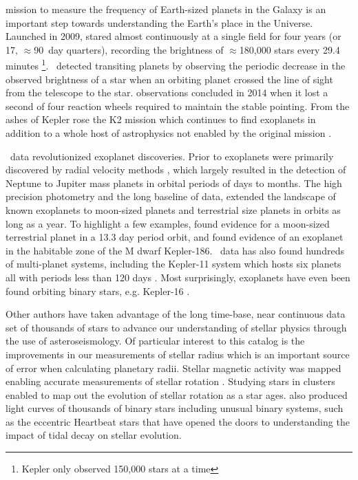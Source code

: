 
 mission to measure the frequency of Earth-sized planets in the Galaxy is an important step towards understanding the Earth's place in the Universe.  Launched in 2009, \Kepler{} stared almost continuously at a single field for four years (or 17, $\approx$90~day quarters), recording the brightness of $\approx$180,000 stars every 29.4 minutes \footnote{Kepler only observed 150,000 stars at a time}. \Kepler\ detected transiting planets by observing the periodic decrease in the observed brightness of a star when an orbiting planet crossed the line of sight from the telescope to the star.  observations concluded in 2014 when it lost a second of four reaction wheels required to maintain the stable pointing.  From the ashes of Kepler rose the K2 mission which continues to find exoplanets in addition to a whole host of astrophysics not enabled by the original \Kepler{} mission \citep{Howell2014}.


\Kepler\ data revolutionized exoplanet discoveries. Prior to \Kepler{,} exoplanets were primarily discovered by radial velocity methods \citep[e.g.][]{Mayor1995}, which largely resulted in the detection of Neptune to Jupiter mass planets in orbital periods of days to months. The high precision photometry and the long baseline of \Kepler{} data, extended the landscape of known exoplanets to moon-sized planets and terrestrial size planets in orbits as long as a year. To highlight a few examples, \citep{Barclay2013} found evidence for a moon-sized terrestrial planet in a 13.3 day period orbit, and \citep{Quintana2014} found evidence of an exoplanet in the habitable zone of the M dwarf Kepler-186. \Kepler\ data has also found hundreds of multi-planet systems, including the Kepler-11 system which hosts six planets all with periods less than 120 days \citep{Lissauer2011}. Most surprisingly, exoplanets have even been found orbiting binary stars, e.g. Kepler-16 \citep{Doyle2011}.

Other authors have taken advantage of the long time-base, near continuous data set of thousands of stars to advance our understanding of stellar physics through the use of asteroseismology. Of particular interest to this catalog is the improvements in our measurements of stellar radius \citep[e.g.][]{Mathur2017} which is an important source of error when calculating planetary radii. Stellar magnetic activity was mapped enabling accurate measurements of stellar rotation \citep[e.g.][]{Aigrain2015,McQuillan2014}. Studying stars in clusters enabled \citet{Meibom2011} to map out the evolution of stellar rotation as a star ages. \Kepler{} also produced light curves of thousands of binary stars \citep{Prsa2011,Kirk2016} including unusual binary systems, such as the eccentric Heartbeat stars \citet{Welsh2011,Thompson2012} that have opened the doors to understanding the impact of tidal decay on stellar evolution.

